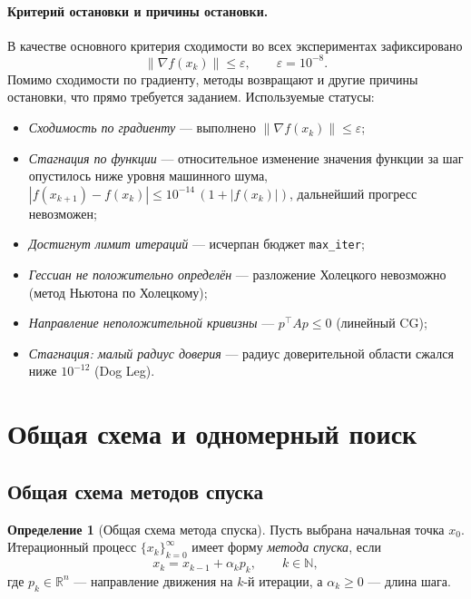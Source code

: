 \documentclass[a4paper,12pt]{article}
\newcommand{\R}{\mathbb{R}}
\newcommand{\norm}[1]{\left\|#1\right\|}
\newcommand{\grad}{\nabla}
\newcommand{\eps}{\varepsilon}
\theoremstyle{definition}
\newtheorem{definition}{Определение}[section]
\begin{document}
\paragraph{Критерий остановки и причины остановки.}
В качестве основного критерия сходимости во всех экспериментах зафиксировано
\[
    \norm{\grad f(x_k)} \leq \eps, \qquad \eps = 10^{-8}.
\]
Помимо сходимости по градиенту, методы возвращают и другие причины остановки, что прямо
требуется заданием. Используемые статусы:
\begin{itemize}
    \item \textit{Сходимость по градиенту} — выполнено $\norm{\grad f(x_k)} \leq \eps$;
    \item \textit{Стагнация по функции} — относительное изменение значения функции за шаг
          опустилось ниже уровня машинного шума,
          $|f(x_{k+1}) - f(x_k)| \leq 10^{-14}\,(1 + |f(x_k)|)$, дальнейший прогресс невозможен;
    \item \textit{Достигнут лимит итераций} — исчерпан бюджет \texttt{max\_iter};
    \item \textit{Гессиан не положительно определён} — разложение Холецкого невозможно
          (метод Ньютона по Холецкому);
    \item \textit{Направление неположительной кривизны} — $p^\top A p \leq 0$ (линейный CG);
    \item \textit{Стагнация: малый радиус доверия} — радиус доверительной области сжался ниже
          $10^{-12}$ (Dog Leg).
\end{itemize}

\section{Общая схема и одномерный поиск}

\subsection{Общая схема методов спуска}

\begin{definition}[Общая схема метода спуска]
    Пусть выбрана начальная точка $x_0$. Итерационный процесс $\{x_k\}_{k=0}^{\infty}$ имеет
    форму \emph{метода спуска}, если
    \[
        x_{k} = x_{k-1} + \alpha_k p_k, \qquad k \in \mathbb{N},
    \]
    где $p_k \in \R^n$ — направление движения на $k$-й итерации, а $\alpha_k \geq 0$ — длина шага.
\end{definition}
\end{document}
